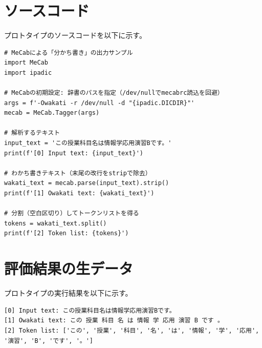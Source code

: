 \documentclass[a4j]{jsarticle}
\begin{document}
\section{ソースコード}
プロトタイプのソースコードを以下に示す。
\begin{screen}
\begin{verbatim}
# MeCabによる「分かち書き」の出力サンプル
import MeCab
import ipadic

# MeCabの初期設定: 辞書のパスを指定（/dev/nullでmecabrc読込を回避）
args = f'-Owakati -r /dev/null -d "{ipadic.DICDIR}"'
mecab = MeCab.Tagger(args)

# 解析するテキスト
input_text = 'この授業科目名は情報学応用演習Bです。'
print(f'[0] Input text: {input_text}')

# わかち書きテキスト（末尾の改行をstripで除去）
wakati_text = mecab.parse(input_text).strip()
print(f'[1] Owakati text: {wakati_text}')

# 分割（空白区切り）してトークンリストを得る
tokens = wakati_text.split()
print(f'[2] Token list: {tokens}')
\end{verbatim}
\end{screen}

\section{評価結果の生データ}
プロトタイプの実行結果を以下に示す。
\begin{screen}
\begin{verbatim}
[0] Input text: この授業科目名は情報学応用演習Bです。
[1] Owakati text: この 授業 科目 名 は 情報 学 応用 演習 B です 。
[2] Token list: ['この', '授業', '科目', '名', 'は', '情報', '学', '応用', '演習', 'B', 'です', '。']
\end{verbatim}
\end{screen}
\end{document}
